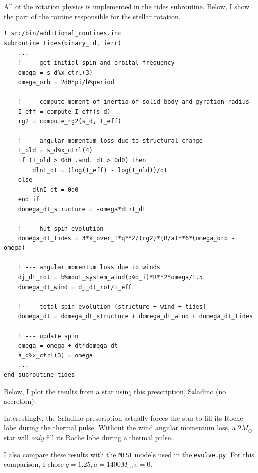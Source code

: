 \documentclass[a4paper,10pt]{article}
\begin{document}
All of the rotation physics is implemented in the tides subroutine.
Below, I show the part of the routine responsible for the stellar rotation.

\begin{verbatim}
! src/bin/additional_routines.inc
subroutine tides(binary_id, ierr)
    ...
    ! --- get initial spin and orbital frequency
    omega = s_d%x_ctrl(3)
    omega_orb = 2d0*pi/b%period

    ! --- compute moment of inertia of solid body and gyration radius
    I_eff = compute_I_eff(s_d)
    rg2 = compute_rg2(s_d, I_eff)

    ! --- angular momentum loss due to structural change
    I_old = s_d%x_ctrl(4)
    if (I_old > 0d0 .and. dt > 0d0) then
        dlnI_dt = (log(I_eff) - log(I_old))/dt
    else
        dlnI_dt = 0d0
    end if
    domega_dt_structure = -omega*dLnI_dt

    ! --- hut spin evolution
    domega_dt_tides = 3*k_over_T*q**2/(rg2)*(R/a)**6*(omega_orb - omega)

    ! --- angular momentum loss due to winds
    dj_dt_rot = b%mdot_system_wind(b%d_i)*R**2*omega/1.5
    domega_dt_wind = dj_dt_rot/I_eff

    ! --- total spin evolution (structure + wind + tides)
    domega_dt = domega_dt_structure + domega_dt_wind + domega_dt_tides

    ! --- update spin
    omega = omega + dt*domega_dt
    s_d%x_ctrl(3) = omega
    ...
end subroutine tides
\end{verbatim}
Below, I plot the results from a star using this prescription, Saladino (no accretion).
\begin{figure}[ht]
    \centering
\end{figure}

Interestingly, the Saladino prescription actually forces the star to fill its Roche lobe during the thermal pulse. Without the wind angular momentum loss, a \(2M_\odot \) star will \emph{only} fill its Roche lobe during a thermal pulse. 

\nextpage

I also compare these results with the \texttt{MIST} models used in the \lstinline[style=output, breaklines=true]|evolve.py|. For this comparison, I chose \(q=1.25, a=1400M_\odot, e=0\).
\end{document}
